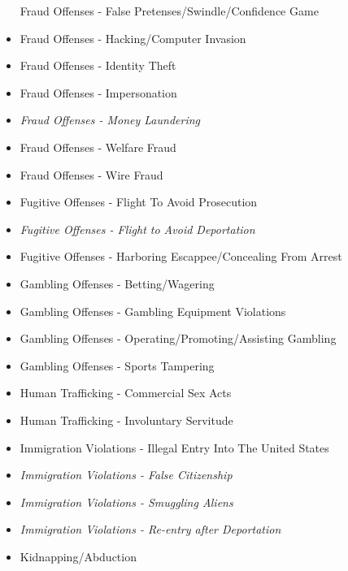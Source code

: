 \documentclass[
]{krantz}
\begin{document}
\begin{itemize}
  Fraud Offenses - False Pretenses/Swindle/Confidence Game\\
\item
  Fraud Offenses - Hacking/Computer Invasion\\
\item
  Fraud Offenses - Identity Theft\\
\item
  Fraud Offenses - Impersonation\\
\item
  \emph{Fraud Offenses - Money Laundering}
\item
  Fraud Offenses - Welfare Fraud\\
\item
  Fraud Offenses - Wire Fraud\\
\item
  Fugitive Offenses - Flight To Avoid Prosecution\\
\item
  \emph{Fugitive Offenses - Flight to Avoid Deportation}\\
\item
  Fugitive Offenses - Harboring Escappee/Concealing From
  Arrest\\
\item
  Gambling Offenses - Betting/Wagering\\
\item
  Gambling Offenses - Gambling Equipment Violations\\
\item
  Gambling Offenses - Operating/Promoting/Assisting
  Gambling\\
\item
  Gambling Offenses - Sports Tampering\\
\item
  Human Trafficking - Commercial Sex Acts\\
\item
  Human Trafficking - Involuntary Servitude\\
\item
  Immigration Violations - Illegal Entry Into The United
  States\\
\item
  \emph{Immigration Violations - False Citizenship}
\item
  \emph{Immigration Violations - Smuggling Aliens}
\item
  \emph{Immigration Violations - Re-entry after
  Deportation}\\
\item
  Kidnapping/Abduction\\

\end{itemize}
\end{document}
